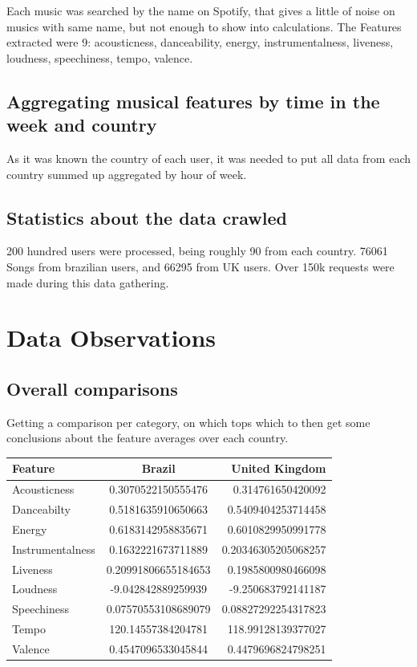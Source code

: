 \documentclass[a4paper]{article}
\begin{document}
Each music was searched by the name on Spotify, that gives a little of noise on musics with same name, but not enough to show into calculations. The Features extracted were 9: acousticness, danceability, energy, instrumentalness, liveness, loudness, speechiness, tempo, valence.

\subsection{Aggregating musical features by time in the week and country}

As it was known the country of each user, it was needed to put all data from each country summed up aggregated by hour of week.

\subsection{Statistics about the data crawled}

200 hundred users were processed, being roughly 90 from each country. 76061 Songs from brazilian users, and 66295 from UK users. Over 150k requests were made during this data gathering.

\section{Data Observations}

\subsection{Overall comparisons}

Getting a comparison per category, on which tops which to then get some conclusions about the feature averages over each country.
\begin{table}
\centering
\begin{tabular}{l|c|r}
Feature & Brazil & United Kingdom \\\hline
Acousticness & 0.3070522150555476 & 0.314761650420092 \\
Danceabilty & 0.5181635910650663 & 0.5409404253714458 \\
Energy & 0.6183142958835671 & 0.6010829950991778 \\
Instrumentalness & 0.1632221673711889 & 0.20346305205068257 \\
Liveness & 0.20991806655184653 & 0.1985800980466098 \\
Loudness & -9.042842889259939 & -9.250683792141187 \\
Speechiness & 0.07570553108689079 & 0.08827292254317823 \\
Tempo & 120.14557384204781 & 118.99128139377027 \\
Valence & 0.4547096533045844 & 0.4479696824798251

\end{tabular}
\end{table}
\end{document}

